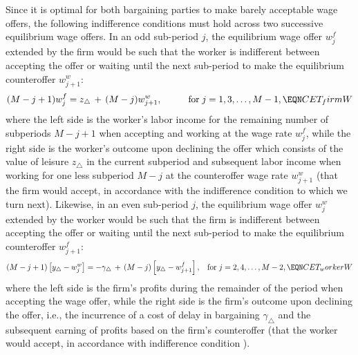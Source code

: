 Since it is optimal for both bargaining parties to make 
barely acceptable wage offers, the following indifference
conditions must hold across two successive 
equilibrium wage offers. 
In an odd sub-period $j$, the 
equilibrium wage offer $w^f_j$ extended by the firm
would be such that the worker is indifferent between 
accepting the offer or waiting until the next sub-period 
to make the equilibrium counteroffer $w^w_{j+1}$:
$$
(M-j+1)w^f_j = z_\triangle \,+\, (M-j) w^w_{j+1},
\hskip1cm \hbox{\rm for} \hskip.1cm j=1,3,\ldots , M-1,  
                                               \EQN CET_firmW
$$
where the left side is the worker's labor income for the
remaining number of subperiods $M-j+1$ when accepting and
working at the wage rate $w^f_j$, while the right side is the
worker's outcome upon declining the offer which consists
of the value of leisure $z_\triangle$ in the current subperiod
and subsequent labor income when working for one less
subperiod $M-j$ at the counteroffer wage rate $w^w_{j+1}$ 
(that the firm would accept, in accordance with the indifference
condition to which we turn next). Likewise, in an even 
sub-period $j$, the equilibrium wage offer $w^w_j$ extended 
by the worker would be such that the firm is indifferent 
between accepting the offer or waiting until the next 
sub-period to make the equilibrium counteroffer $w^f_{j+1}$:
$$
(M-j+1)\left[y_\triangle - w^w_j \right] = - \gamma_\triangle 
\,+\, (M-j) \left[y_\triangle - w^f_{j+1} \right],
\hskip.3cm \hbox{\rm for} \hskip.1cm j=2,4,\ldots , M-2,  
                                               \EQN CET_workerW
$$
where the left side is the firm's profits during the 
remainder of the period when accepting the 
wage offer, while the right side is the firm's outcome upon
declining the offer, i.e., the incurrence of a cost of delay 
in bargaining $\gamma_\triangle$ and the subsequent earning
of profits based on the firm's counteroffer (that the 
worker would accept, in accordance with indifference condition 
).

